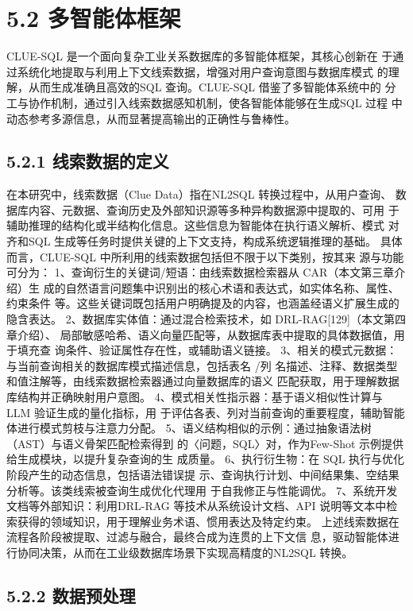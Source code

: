 \documentclass[12pt,a4paper,openright,UTF8]{ctexbook}
\begin{document}
\section{5.2 多智能体框架}

CLUE-SQL 是一个面向复杂工业关系数据库的多智能体框架，其核心创新在 于通过系统化地提取与利用上下文线索数据，增强对用户查询意图与数据库模式 的理解，从而生成准确且高效的SQL 查询。CLUE-SQL 借鉴了多智能体系统中的 分工与协作机制，通过引入线索数据感知机制，使各智能体能够在生成SQL 过程 中动态参考多源信息，从而显著提高输出的正确性与鲁棒性。

\subsection{5.2.1 线索数据的定义}

在本研究中，线索数据（Clue Data）指在NL2SQL 转换过程中，从用户查询、 数据库内容、元数据、查询历史及外部知识源等多种异构数据源中提取的、可用 于辅助推理的结构化或半结构化信息。这些信息为智能体在执行语义解析、模式 对齐和SQL 生成等任务时提供关键的上下文支持，构成系统逻辑推理的基础。 具体而言，CLUE-SQL 中所利用的线索数据包括但不限于以下类别，按其来 源与功能可分为： 1、查询衍生的关键词/短语：由线索数据检索器从 CAR（本文第三章介绍）生 成的自然语言问题集中识别出的核心术语和表达式，如实体名称、属性、约束条件 等。这些关键词既包括用户明确提及的内容，也涵盖经语义扩展生成的隐含表达。 2、数据库实体值：通过混合检索技术，如 DRL-RAG[129]（本文第四章介绍）、 局部敏感哈希、语义向量匹配等，从数据库表中提取的具体数据值，用于填充查 询条件、验证属性存在性，或辅助语义链接。 3、相关的模式元数据：与当前查询相关的数据库模式描述信息，包括表名 /列 名描述、注释、数据类型和值注解等，由线索数据检索器通过向量数据库的语义 匹配获取，用于理解数据库结构并正确映射用户意图。 4、模式相关性指示器：基于语义相似性计算与 LLM 验证生成的量化指标，用 于评估各表、列对当前查询的重要程度，辅助智能体进行模式剪枝与注意力分配。 5、语义结构相似的示例：通过抽象语法树（AST）与语义骨架匹配检索得到 的〈问题，SQL〉对，作为Few-Shot 示例提供给生成模块，以提升复杂查询的生 成质量。 6、执行衍生物：在 SQL 执行与优化阶段产生的动态信息，包括语法错误提 示、查询执行计划、中间结果集、空结果分析等。该类线索被查询生成优化代理用 于自我修正与性能调优。 7、系统开发文档等外部知识：利用DRL-RAG 等技术从系统设计文档、API 说明等文本中检索获得的领域知识，用于理解业务术语、惯用表达及特定约束。 上述线索数据在流程各阶段被提取、过滤与融合，最终合成为连贯的上下文信 息，驱动智能体进行协同决策，从而在工业级数据库场景下实现高精度的NL2SQL 转换。

\subsection{5.2.2 数据预处理}
\end{document}

